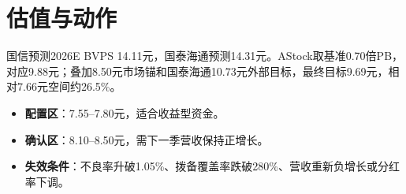\section{估值与动作}

国信预测2026E BVPS 14.11元，国泰海通预测14.31元。AStock取基准0.70倍PB，对应9.88元；叠加8.50元市场锚和国泰海通10.73元外部目标，最终目标9.69元，相对7.66元空间约26.5\%。

\begin{itemize}
  \item \textbf{配置区}：7.55--7.80元，适合收益型资金。
  \item \textbf{确认区}：8.10--8.50元，需下一季营收保持正增长。
  \item \textbf{失效条件}：不良率升破1.05\%、拨备覆盖率跌破280\%、营收重新负增长或分红率下调。
\end{itemize}
